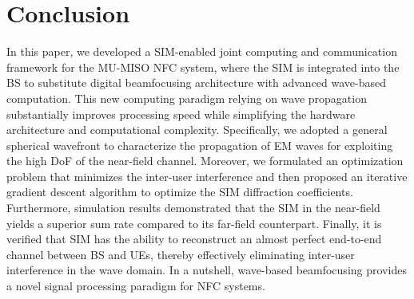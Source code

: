 \documentclass[conference]{IEEEtran}
\theoremstyle{remark}
\begin{document}
\section{Conclusion}\label{Sec_V}
In this paper, we developed a SIM-enabled joint computing and communication framework for the MU-MISO NFC system, where the SIM is integrated into the BS to substitute digital beamfocusing architecture with advanced wave-based computation. 
This new computing paradigm relying on wave propagation substantially improves processing speed while simplifying the hardware architecture and computational complexity. 
Specifically, we adopted a general spherical wavefront to characterize the propagation of EM waves for exploiting the high DoF of the near-field channel.
Moreover, we formulated an optimization problem that minimizes the inter-user interference and then proposed an iterative gradient descent algorithm to optimize the SIM diffraction coefficients.
Furthermore, simulation results demonstrated that the SIM in the near-field yields a superior sum rate compared to its far-field counterpart. Finally, it is verified that SIM has the ability to reconstruct an almost perfect end-to-end channel between BS and UEs, thereby effectively eliminating inter-user interference in the wave domain. 
In a nutshell, wave-based beamfocusing provides a novel signal processing paradigm for NFC systems.




\end{document}
